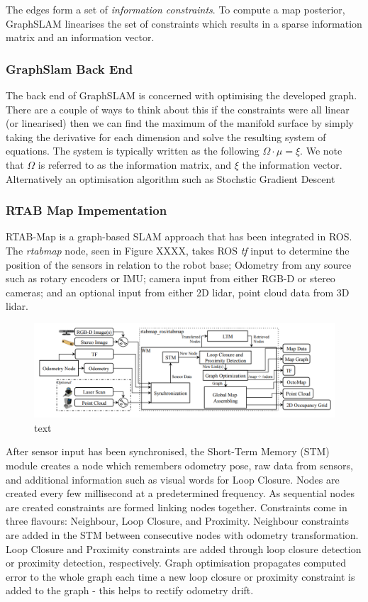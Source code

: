 \documentclass[a4paper]{article}
\begin{document}
The edges form a set of \textit{information constraints}. To compute a map posterior, GraphSLAM linearises the set of constraints which results in a sparse information matrix and an information vector. 

\subsubsection{GraphSlam Back End}
The back end of GraphSLAM is concerned with optimising the developed graph. There are a couple of ways to think about this if the constraints were all linear (or linearised) then we can find the maximum of the manifold surface by simply taking the derivative for each dimension and solve the resulting system of equations. The system is typically written as the following $\Omega \cdot \mu = \xi$. We note that $\Omega$ is referred to as the information matrix, and $\xi$ the information vector. Alternatively an optimisation algorithm such as Stochstic Gradient Descent 


\subsubsection{RTAB Map Impementation}
RTAB-Map is a graph-based SLAM approach that has been integrated in ROS. The \textit{rtabmap} node, seen in Figure XXXX, takes ROS \textit{tf} input to determine the position of the sensors in relation to the robot base; Odometry from any source such as rotary encoders or IMU; camera input from either RGB-D or stereo cameras; and an optional input from either 2D lidar, point cloud data from 3D lidar.
\begin{figure}[h]
\centering
\includegraphics[scale=0.3]{rtabmap_node}
\caption{text}
\end{figure}

After sensor input has been synchronised, the Short-Term Memory (STM) module creates a node which remembers odometry pose, raw data from sensors, and additional information such as visual words for Loop Closure. Nodes are created every few millisecond at a predetermined frequency. As sequential nodes are created constraints are formed linking nodes together. Constraints come in three flavours: Neighbour, Loop Closure, and Proximity. Neighbour constraints are added in the STM between consecutive nodes with odometry transformation. Loop Closure and Proximity constraints are added through loop closure detection or proximity detection, respectively. Graph optimisation propagates computed error to the whole graph each time a new loop closure or proximity constraint is added to the graph - this helps to rectify odometry drift.
\end{document}
